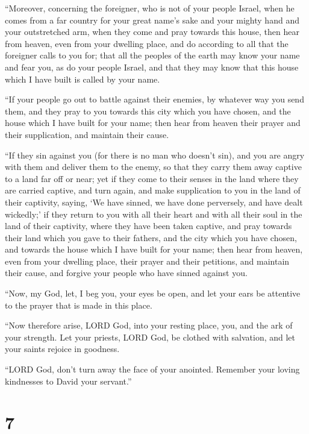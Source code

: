  ``Moreover, concerning the foreigner, who is not of your
people Israel, when he comes from a far country for your great name's
sake and your mighty hand and your outstretched arm, when they come and
pray towards this house,  then hear from heaven, even from
your dwelling place, and do according to all that the foreigner calls to
you for; that all the peoples of the earth may know your name and fear
you, as do your people Israel, and that they may know that this house
which I have built is called by your name.

 ``If your people go out to battle against their enemies,
by whatever way you send them, and they pray to you towards this city
which you have chosen, and the house which I have built for your name;
 then hear from heaven their prayer and their supplication,
and maintain their cause.

 ``If they sin against you (for there is no man who doesn't
sin), and you are angry with them and deliver them to the enemy, so that
they carry them away captive to a land far off or near; 
yet if they come to their senses in the land where they are carried
captive, and turn again, and make supplication to you in the land of
their captivity, saying, `We have sinned, we have done perversely, and
have dealt wickedly;'  if they return to you with all their
heart and with all their soul in the land of their captivity, where they
have been taken captive, and pray towards their land which you gave to
their fathers, and the city which you have chosen, and towards the house
which I have built for your name;  then hear from heaven,
even from your dwelling place, their prayer and their petitions, and
maintain their cause, and forgive your people who have sinned against
you.

 ``Now, my God, let, I beg you, your eyes be open, and let
your ears be attentive to the prayer that is made in this place.

 ``Now therefore arise, LORD God, into your resting place,
you, and the ark of your strength. Let your priests, LORD God, be
clothed with salvation, and let your saints rejoice in goodness.

 ``LORD God, don't turn away the face of your anointed.
Remember your loving kindnesses to David your servant.''

\hypertarget{section-6}{%
\section{7}\label{section-6}}


